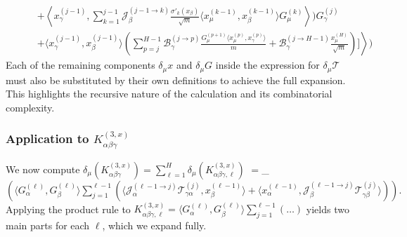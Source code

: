 \documentclass[11pt,a4paper]{article}
\theoremstyle{definition}
\begin{document}
\begin{align}
& \qquad \left. + \left\langle x^{(j-1)}_\gamma, \sum_{k=1}^{j-1} \mathcal{J}^{(j-1 \to k)}_{\beta} \frac{\sigma'_{k}(x_\beta)}{\sqrt{m}} \langle x^{(k-1)}_\mu, x^{(k-1)}_\beta \rangle G^{(k)}_\mu \right\rangle \Biggr) G^{(j)}_\gamma \right. \nonumber \\
& \qquad \left. + \langle x^{(j-1)}_\gamma, x^{(j-1)}_\beta \rangle \left( \sum_{p=j}^{H-1} \mathcal{B}^{(j \to p)}_{\gamma} \frac{G^{(p+1)}_\mu \langle x^{(p)}_\mu, x^{(p)}_\gamma \rangle}{m} + \mathcal{B}^{(j \to H-1)}_{\gamma} \frac{x^{(H)}_\mu}{\sqrt{m}} \right) \Biggr] \right\rangle \Biggr)
\end{align}
Each of the remaining components $\delta_\mu x$ and $\delta_\mu G$ inside the expression for $\delta_\mu \mathcal{T}$ must also be substituted by their own definitions to achieve the full expansion. This highlights the recursive nature of the calculation and its combinatorial complexity.




















\subsubsection{Application to $K^{(3, x)}_{\alpha\beta\gamma}$}

We now compute $\delta_\mu(K^{(3, x)}_{\alpha\beta\gamma}) = \sum_{\ell=1}^H \delta_\mu(K^{(3, x)}_{\alpha\beta\gamma, \ell})$
\newline
$= $\delta_\mu$ (\langle G^{(\ell)}_\alpha, G^{(\ell)}_\beta \rangle \sum_{j=1}^{\ell-1} \left( \langle \mathcal{J}^{(\ell-1 \to j)}_{\alpha} \mathcal{T}^{(j)}_{\gamma\alpha}, x^{(\ell-1)}_\beta \rangle + \langle x^{(\ell-1)}_\alpha, \mathcal{J}^{(\ell-1 \to j)}_{\beta} \mathcal{T}^{(j)}_{\gamma\beta} \rangle \right)).$
Applying the product rule to $K^{(3, x)}_{\alpha\beta\gamma, \ell} = \langle G^{(\ell)}_\alpha, G^{(\ell)}_\beta \rangle \sum_{j=1}^{\ell-1} (\dots)$ yields two main parts for each $\ell$, which we expand fully.
\end{document}
